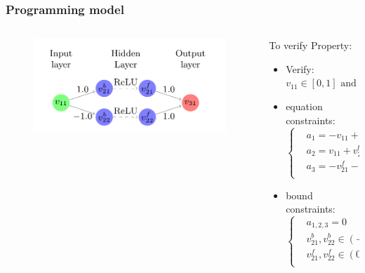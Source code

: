 \documentclass[aspectratio=169%
,serif,mathserif]{beamer}
\begin{document}
\begin{frame}
	\frametitle{Programming model}
	\begin{columns}
		\begin{column}{.5\textwidth}
			\begin{figure}[htbp]
				\includegraphics[width=1\linewidth]{4.png}
			\end{figure}
		\end{column}

		\begin{column}{.5\textwidth}
			To verify Property:
			\begin{itemize}
				\item Verify: $v_{11} \in[0,1] \text { and } v_{31} \in[0.5,1]$
				\item equation constraints:
				\begin{equation}
					\left\{
						\begin{array}{lll}
						& a_{1}=-v_{11}+v_{21}^{b} \\
						& a_{2}=v_{11}+v_{22}^{b} \\
						& a_{3}=-v_{21}^{f}-v_{22}^{f}+v_{31} \\
					\end{array} \right.
				\end{equation}
				\item bound constraints: 
				\begin{equation}
					\left\{
						\begin{array}{lll}
						& a_{1,2,3}= 0 \\
						& v_{21}^{b},v_{22}^{b} \in (-\infty,\infty)\\
						& v_{21}^{f},v_{22}^{f} \in (0,\infty)\\
					\end{array} \right.
				\end{equation}
			\end{itemize}
		\end{column}
	\end{columns}
\end{frame}
\end{document}
